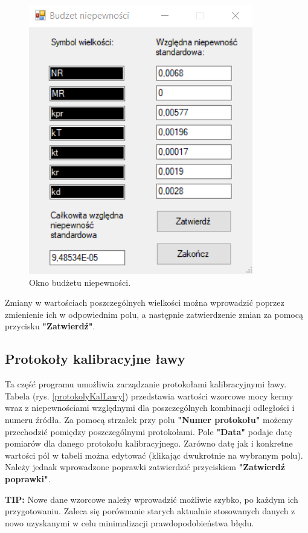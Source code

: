\begin{figure}[htb]
	\centering
	\includegraphics{obrazki/Ustawienia/budzet_niepewnosci.png}
	\caption{Okno budżetu niepewności.}
	\label{budzetNiepewnosci}
\end{figure}

Zmiany w wartościach poszczególnych wielkości można wprowadzić poprzez zmienienie ich w odpowiednim polu, a następnie zatwierdzenie zmian za pomocą przycisku \textbf{"Zatwierdź"}.

\subsection{Protokoły kalibracyjne ławy}
\label{protokoly_kal_lawy}

Ta część programu umożliwia zarządzanie protokołami kalibracyjnymi ławy. Tabela (rys. \ref{protokolyKalLawy}) przedstawia wartości wzorcowe mocy kermy wraz z niepewnościami względnymi dla poszczególnych kombinacji odległości i numeru źródła. Za pomocą strzałek przy polu \textbf{"Numer protokołu"} możemy przechodzić pomiędzy poszczególnymi protokołami. Pole \textbf{"Data"} podaje datę pomiarów dla danego protokołu kalibracyjnego. Zarówno datę jak i konkretne wartości pól w tabeli można edytować (klikając dwukrotnie na wybranym polu). Należy jednak wprowadzone poprawki zatwierdzić przyciskiem \textbf{"Zatwierdź poprawki"}.

\textbf{TIP:} Nowe dane wzorcowe należy wprowadzić możliwie szybko, po każdym ich przygotowaniu. Zaleca się porównanie starych aktualnie stosowanych danych z nowo uzyskanymi w celu minimalizacji prawdopodobieństwa błędu.

